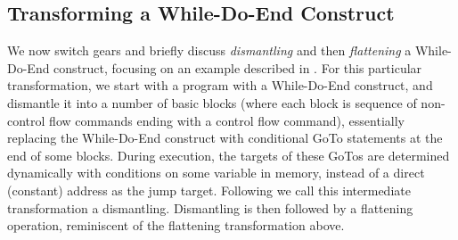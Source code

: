 \documentclass[compsoc,conference,a4paper,10pt,times]{IEEEtran}
\begin{document}
\subsection{Transforming a While-Do-End Construct}\label{4.4}
We now switch gears and briefly discuss \emph{dismantling} and then \emph{flattening} a While-Do-End construct, focusing on an example described in \cite{Wang}.
For this particular transformation, we start with a program with a While-Do-End construct, and dismantle it into a number of basic blocks (where each block is sequence of non-control flow commands ending with a control flow command), essentially replacing the While-Do-End construct with conditional GoTo statements at the end of some blocks.  During execution, the targets of these GoTos are determined dynamically with conditions on some variable in memory, instead of a direct (constant) address as the jump target. Following \cite{Wang} we call this intermediate transformation a dismantling.
Dismantling is then followed by a flattening operation, reminiscent of the flattening transformation above.



\end{document}
